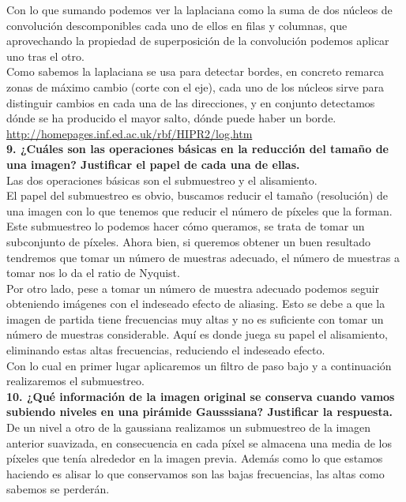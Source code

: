 \documentclass[10pt,a4paper]{article}
\begin{document}
Con lo que sumando podemos ver la laplaciana como la suma de dos núcleos de convolución descomponibles cada uno de ellos en filas y columnas, que aprovechando la propiedad de superposición de la convolución podemos aplicar uno tras el otro.\\

Como sabemos la laplaciana se usa para detectar bordes, en concreto remarca zonas de máximo cambio (corte con el eje), cada uno de los núcleos sirve para distinguir cambios en cada una de las direcciones, y en conjunto detectamos dónde se ha producido el mayor salto, dónde puede haber un borde.\\

\url{http://homepages.inf.ed.ac.uk/rbf/HIPR2/log.htm}\\

\textbf{9. ¿Cuáles son las operaciones básicas en la reducción del tamaño de una imagen? Justificar el papel de cada una de ellas.}\\

Las dos operaciones básicas son el submuestreo y el alisamiento.\\

El papel del submuestreo es obvio, buscamos reducir el tamaño (resolución) de una imagen con lo que tenemos que reducir el número de píxeles que la forman. Este submuestreo lo podemos hacer cómo queramos, se trata de tomar un subconjunto de píxeles. Ahora bien, si queremos obtener un buen resultado tendremos que tomar un número de muestras adecuado, el número de muestras a tomar nos lo da el ratio de Nyquist.\\

Por otro lado, pese a tomar un número de muestra adecuado podemos seguir obteniendo imágenes con el indeseado efecto de aliasing. Esto se debe a que la imagen de partida tiene frecuencias muy altas y no es suficiente con tomar un número de muestras considerable. Aquí es donde juega su papel el alisamiento, eliminando estas altas frecuencias, reduciendo el indeseado efecto.\\

Con lo cual en primer lugar aplicaremos un filtro de paso bajo y a continuación realizaremos el submuestreo.\\

\textbf{10. ¿Qué información de la imagen original se conserva cuando vamos
subiendo niveles en una pirámide Gausssiana? Justificar la respuesta.}\\

De un nivel a otro de la gaussiana realizamos un submuestreo de la imagen anterior suavizada, en consecuencia en cada píxel se almacena una media de los píxeles que tenía alrededor en la imagen previa. Además como lo que estamos haciendo es alisar lo que conservamos son las bajas frecuencias, las altas como sabemos se perderán.\\
\end{document}
